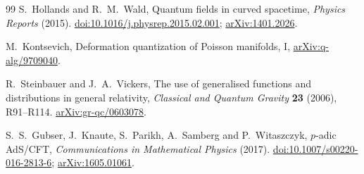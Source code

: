 \documentclass[11pt,a4paper]{article}
\numberwithin{equation}{section}
\theoremstyle{definition}
\theoremstyle{remark}
\newcommand{\arxiv}[1]{\href{https://arxiv.org/abs/#1}{arXiv:#1}}
\newcommand{\doi}[1]{\href{https://doi.org/#1}{doi:#1}}
\begin{document}
\begin{thebibliography}{99}
S.~Hollands and R.~M.~Wald, Quantum fields in curved spacetime,
\emph{Physics Reports} (2015). \doi{10.1016/j.physrep.2015.02.001};
\arxiv{1401.2026}.

M.~Kontsevich, Deformation quantization of Poisson manifolds, I,
\arxiv{q-alg/9709040}.

R.~Steinbauer and J.~A.~Vickers, The use of generalised functions and
distributions in general relativity,
\emph{Classical and Quantum Gravity} \textbf{23} (2006), R91--R114.
\arxiv{gr-qc/0603078}.

S.~S.~Gubser, J.~Knaute, S.~Parikh, A.~Samberg and P.~Witaszczyk,
$p$-adic AdS/CFT, \emph{Communications in Mathematical Physics} (2017).
\doi{10.1007/s00220-016-2813-6}; \arxiv{1605.01061}.

\end{thebibliography}
\end{document}
